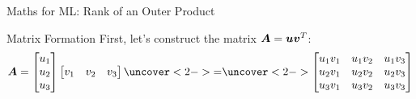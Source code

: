 \documentclass[handout]{beamer}
\begin{document}


\begin{frame}{Maths for ML: Rank of an Outer Product}
    \begin{keypointsbox}{Matrix Formation}
    First, let's construct the matrix $\bm{A} = \bm{u}\bm{v}^T$:
    $$
    \vecMat{A} = \begin{bmatrix} u_1 \\ u_2 \\ u_3 \end{bmatrix}
    \begin{bmatrix} v_1 & v_2 & v_3 \end{bmatrix}
    \uncover<2->{=}
    \uncover<2->{
    \begin{bmatrix}
        u_1v_1 & u_1v_2 & u_1v_3 \\
        u_2v_1 & u_2v_2 & u_2v_3 \\
        u_3v_1 & u_3v_2 & u_3v_3
    \end{bmatrix}
    }
    $$
    \end{keypointsbox}
\end{frame}
\end{document}
